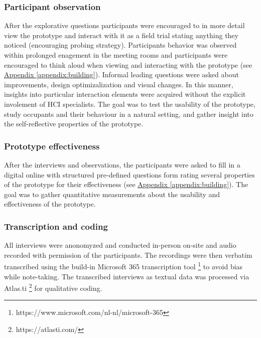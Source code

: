 \subsubsection{Participant observation}

After the explorative questions participants were encouraged to in more detail view the prototype and interact with it as a field trial stating anything they noticed (encouraging probing strategy). Participants behavior was observed within prolonged enagement in the meeting rooms and participants were encouraged to think aloud when viewing and interacting with the prototype (see \hyperref[appendix:building]{Appendix \ref*{appendix:building}}). Informal leading questions were asked about improvements, design optimizalization and visual changes. In this manner, insights into particular interaction elements were acquired without the explicit involement of HCI specialists. The goal was to test the usability of the prototype, study occupants and their behaviour in a natural setting, and gather insight into the self-reflective properties of the prototype. 

\subsubsection{Prototype effectiveness}

After the interviews and observations, the participants were asked to fill in a digital online with structured pre-defined questions form rating several properties of the prototype for their effectiveness (see \hyperref[appendix:building]{Appendix \ref*{appendix:building}}). The goal was to gather quantitative measurements about the usability and effectiveness of the prototype.

\subsubsection{Transcription and coding}
All interviews were anonomyzed and conducted in-person on-site and audio recorded with permission of the participants. The recordings were then verbatim transcribed using the build-in Microsoft 365 transcription tool \footnote{https://www.microsoft.com/nl-nl/microsoft-365} to avoid bias while note-taking. The transcribed interviews as textual data was processed via Atlas.ti \footnote{https://atlasti.com/} for qualitative coding.